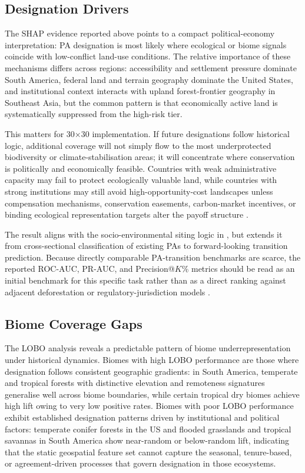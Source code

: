 \documentclass[12pt]{article}
\theoremstyle{break}
\begin{document}
\subsection{Designation Drivers}
\label{sec:disc_drivers}
The SHAP evidence reported above points to a compact
political-economy interpretation: PA designation is most likely where ecological or
biome signals coincide with low-conflict land-use conditions. The relative importance
of these mechanisms differs across regions: accessibility and settlement pressure
dominate South America, federal land and terrain geography dominate the United States,
and institutional context interacts with upland forest-frontier geography in Southeast
Asia, but the common pattern is that economically active land is systematically
suppressed from the high-risk tier.

This matters for 30$\times$30 implementation. If future designations follow historical
logic, additional coverage will not simply flow to the most underprotected biodiversity
or climate-stabilisation areas; it will concentrate where conservation is politically
and economically feasible. Countries with weak administrative capacity may fail to
protect ecologically valuable land, while countries with strong institutions may still
avoid high-opportunity-cost landscapes unless compensation mechanisms, conservation
easements, carbon-market incentives, or binding ecological representation targets alter
the payoff structure \citep{venter2018, eckert2023}.

The result aligns with the socio-environmental siting logic in \citet{mouillot2024},
but extends it from cross-sectional classification of existing PAs to forward-looking
transition prediction. Because directly comparable PA-transition benchmarks are scarce,
the reported ROC-AUC, PR-AUC, and Precision@$K$\% metrics should be read as an initial
benchmark for this specific task rather than as a direct ranking against adjacent
deforestation or regulatory-jurisdiction models \citep{mayfield2017, ball2022,
greenhill2024}.

\subsection{Biome Coverage Gaps}
\label{sec:disc_representation}
The LOBO analysis reveals a predictable pattern of biome underrepresentation under
historical dynamics. Biomes with high LOBO performance are those where designation
follows consistent geographic gradients: in South America, temperate and tropical
forests with distinctive elevation and remoteness signatures generalise well across
biome boundaries, while certain tropical dry biomes achieve high lift owing to very
low positive rates. Biomes with poor LOBO performance exhibit established
designation patterns driven by institutional and political factors: temperate conifer
forests in the US and flooded grasslands and tropical savannas in South America show
near-random or below-random lift, indicating that the static geospatial feature set
cannot capture the seasonal, tenure-based, or agreement-driven processes that govern
designation in those ecosystems.
\end{document}
